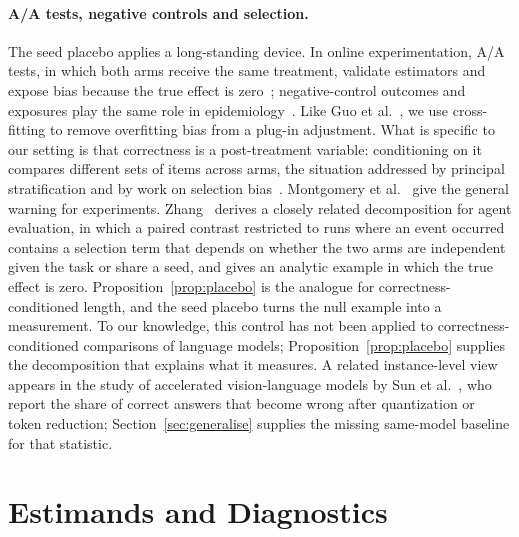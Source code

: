 \documentclass[11pt,a4paper]{article}
\begin{document}
\paragraph{A/A tests, negative controls and selection.} The seed placebo applies a long-standing device. In online experimentation, A/A tests, in which both arms receive the same treatment, validate estimators and expose bias because the true effect is zero~\cite{kohavi2020trustworthy,guo2021mlrate,aadiag2016}; negative-control outcomes and exposures play the same role in epidemiology~\cite{lipsitch2010negative}. Like Guo et al.~\cite{guo2021mlrate}, we use cross-fitting to remove overfitting bias from a plug-in adjustment. What is specific to our setting is that correctness is a post-treatment variable: conditioning on it compares different sets of items across arms, the situation addressed by principal stratification and by work on selection bias~\cite{frangakis2002principal,zhang2003truncation,hernan2004selection}. Montgomery et al.~\cite{montgomery2018posttreatment} give the general warning for experiments. Zhang~\cite{zhang2026skill} derives a closely related decomposition for agent evaluation, in which a paired contrast restricted to runs where an event occurred contains a selection term that depends on whether the two arms are independent given the task or share a seed, and gives an analytic example in which the true effect is zero. Proposition~\ref{prop:placebo} is the analogue for correctness-conditioned length, and the seed placebo turns the null example into a measurement. To our knowledge, this control has not been applied to correctness-conditioned comparisons of language models; Proposition~\ref{prop:placebo} supplies the decomposition that explains what it measures. A related instance-level view appears in the study of accelerated vision-language models by Sun et al.~\cite{hiddeninstability2025}, who report the share of correct answers that become wrong after quantization or token reduction; Section~\ref{sec:generalise} supplies the missing same-model baseline for that statistic.

\section{Estimands and Diagnostics}
\label{sec:metrics}
\end{document}
